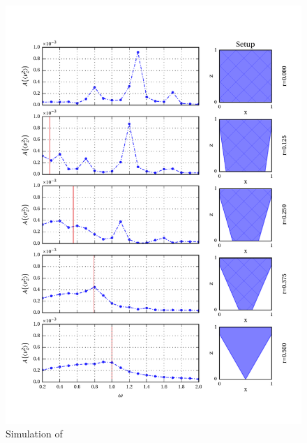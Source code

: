 \begin{figure}[!pt]
  \centering
  \includegraphics{gfx/cone/transition/transition.pdf}
  \caption{\label{fig:cone:transition}
    Simulation of
  }
\end{figure}

